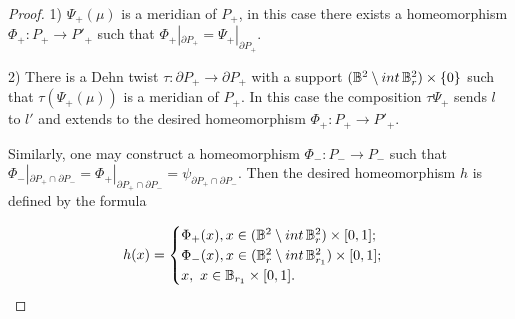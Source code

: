 \documentclass[10pt,a4paper]{amsart}
\begin{document}
\begin{proof}
1)   $\Psi_+(\mu)$ is a meridian of $P_+$, in this case there exists a homeomorphism $\Phi_+: P_+\to P'_+$ such that $\Phi_+|_{\partial P_+}=\Psi_{+}|_{\partial P_+}$.

2) There is a Dehn twist $\tau: \partial P_+\to \partial P_+$ with a support $(\mathbb B^2\setminus {\rm int}\, \mathbb B^2_r)\times \{0\}$ such that
$\tau(\Psi_+(\mu))$ is  a meridian of $P_+$.  In this case the composition $\tau \Psi_+$ sends $l$ to $l'$ and  extends to the desired homeomorphism $\Phi_+: P_+\to P'_+$.

 Similarly, one may construct a homeomorphism $\Phi_-: P_-\to P_-$ such that $\Phi_-|_{\partial P_+\cap \partial P_-}=\Phi_+|_{\partial P_+\cap \partial P_-}=\psi_{\partial P_+\cap \partial P_-}$. Then the  desired homeomorphism $h$ is defined by the formula

\begin{equation}
h(x)=\begin{cases}\Phi_+(x), x\in (\mathbb B^2\setminus {\rm int}\, \mathbb B^2_{r}) \times [0,1];\cr
\Phi_-(x), x\in (\mathbb B^2_r\setminus {\rm int}\, \mathbb B^2_{r_1}) \times [0,1];\cr
x,\ x\in \mathbb B_{r_1}\times [0,1].\end{cases}
\end{equation}

\end{proof}
\end{document}
